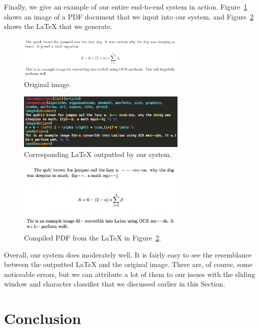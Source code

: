 \documentclass[10pt]{IEEEtran}
\newcommand{\latex}{\LaTeX\xspace}
\begin{document}
Finally, we give an example of our entire end-to-end system in action. Figure~\ref{fig:paper1} shows an image of a PDF document that we input into our system, and Figure~\ref{fig:latex1} shows the \latex that we generate.

\begin{figure}[h]
  \centering
    \includegraphics[width=3.2in]{paper2.png}
  \caption{Original image.}
  \label{fig:paper1}
\end{figure}

\begin{figure}[h]
  \centering
    \includegraphics[width=3.2in]{paper2tex.png}
  \caption{Corresponding \latex outputted by our system.}
  \label{fig:latex1}
\end{figure}

\begin{figure}[h]
  \centering
    \includegraphics[width=3.2in]{paper2out.png}
  \caption{Compiled PDF from the \latex in Figure~\ref{fig:latex1}.}
  \label{fig:paper1out}
\end{figure}

Overall, our system does moderately well. It is fairly easy to see the resemblance between the outputted \latex and the original image. There are, of course, some noticeable errors, but we can attribute a lot of them to our issues with the sliding window and character classifier that we discussed earlier in this Section.

\section{Conclusion}
\end{document}
